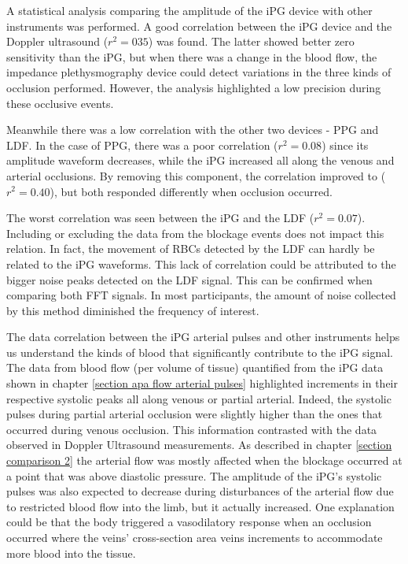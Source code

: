 A statistical analysis comparing the amplitude of the iPG device with other instruments was performed.  A good correlation between the iPG device and the Doppler ultrasound ($r^2 = 035$) was found. The latter showed better zero sensitivity than the iPG, but when there was a change in the blood flow, the impedance plethysmography device could detect variations in the three kinds of occlusion performed. However, the analysis highlighted a low precision during these occlusive events. 

Meanwhile there was a low correlation with the other two devices - PPG and LDF. In the case of PPG, there was a poor correlation ($r^2 = 0.08$) since its amplitude waveform decreases, while the iPG increased all along the venous and arterial occlusions.  By removing this component, the correlation improved to ($r^2 = 0.40$), but both responded differently when occlusion occurred.

The worst correlation was seen between the iPG and the LDF ($r^2 = 0.07$). Including or excluding the data from the blockage events does not impact this relation. In fact, the movement of RBCs detected by the LDF can hardly be related to the iPG waveforms. This lack of correlation could be attributed to the bigger noise peaks detected on the LDF signal. This can be confirmed when comparing both FFT signals. In most participants, the amount of noise collected by this method diminished the frequency of interest. 

The data correlation between the iPG arterial pulses and other instruments helps us understand the kinds of blood that significantly contribute to the iPG signal. The data from blood flow (per volume of tissue) quantified from the iPG data shown in chapter \ref{section apa flow arterial pulses} highlighted increments in their respective systolic peaks all along venous or partial arterial. Indeed, the systolic pulses during partial arterial occlusion were slightly higher than the ones that occurred during venous occlusion. This information contrasted with the data observed in Doppler Ultrasound measurements. As described in chapter \ref{section comparison 2} the arterial flow was mostly affected when the blockage occurred at a point that was above diastolic pressure. The amplitude of the iPG's systolic pulses was also expected to decrease during disturbances of the arterial flow due to restricted blood flow into the limb, but it actually increased. One explanation could be that the body triggered a vasodilatory response when an occlusion occurred where the veins' cross-section area veins increments to accommodate more blood into the tissue. 

